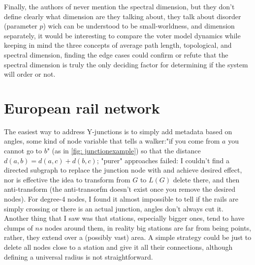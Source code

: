 \begin{appendices}
Finally, the authors of \cite{suchecki2005voter} never mention the spectral dimension, but they don't define clearly what dimension are they talking about, they talk about disorder (parameter $p$) wich can be understood to be small-worldness, and dimension separately, it would be interesting to compare the voter model dynamics while keeping in mind the three concepts of average path length, topological, and spectral dimension, finding the edge cases could confirm or refute that the spectral dimension is truly the only deciding factor for determining if the system will order or not. 
\section{European rail network}
The easiest way to address Y-junctions is to simply add metadata based on angles, some kind of node variable that tells a walker:"if you come from $a$ you cannot go to $b$" (as in \ref{fig: junctionexample}) so that the distance $d(a,b) = d(a,c) + d(b,c)$; "purer" approaches failed: I couldn't find a directed subgraph to replace the junction node with and achieve desired effect, nor is effective the idea to transform from $G$ to $L(G)$ delete there, and then anti-transform (the anti-transorfm doesn't exist once you remove the desired nodes).
For degree-4 nodes, I found it almost impossible to tell if the rails are simply crossing or there is an actual junction, angles don't always cut it.\\ 
Another thing that I saw was that stations, especially bigger ones, tend to have clumps of $ns$ nodes around them, in reality big stations are far from being points, rather, they extend over a (possibly vast) area. A simple strategy could be just to delete all nodes close to a station and give it all their connections, although defining a universal radius is not straightforward.\\
\end{appendices}
